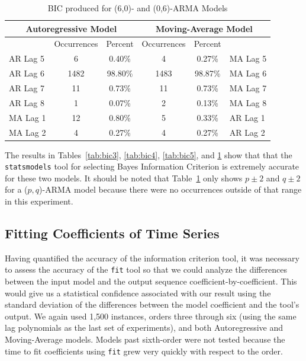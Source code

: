 \documentclass[oneside,12pt,openany]{book}
\begin{document}
    \begin{table}[hbt!]
        \centering
        \begin{tabular}{|l|c|c|c|c|l|}
            \hline
            \multicolumn{3}{|c|}{Autoregressive Model} & \multicolumn{3}{c|}{Moving-Average Model} \\ \hline
            \cellcolor{black} & Occurrences & Percent & Occurrences & Percent & \cellcolor{black} \\ \hline
            AR Lag 5 & 6 & 0.40\% & 4 & 0.27\% & MA Lag 5 \\ \hline
            AR Lag 6 & 1482 & 98.80\% & 1483 & 98.87\% & MA Lag 6 \\ \hline
            AR Lag 7 & 11 & 0.73\% & 11 & 0.73\% & MA Lag 7 \\ \hline
            AR Lag 8 & 1 & 0.07\% & 2 & 0.13\% & MA Lag 8 \\ \hline
            MA Lag 1 & 12 & 0.80\% & 5 & 0.33\% & AR Lag 1 \\ \hline
            MA Lag 2 & 4 & 0.27\% & 4 & 0.27\% & AR Lag 2 \\ \hline
        \end{tabular}
        \caption{BIC produced for (6,0)- and (0,6)-ARMA Models}
        \label{tab:bic6}
    \end{table}
    
    
    The results in Tables~\ref{tab:bic3}, \ref{tab:bic4}, \ref{tab:bic5}, and \ref{tab:bic6} show that that the \texttt{statsmodels} tool for selecting Bayes Information Criterion is extremely accurate for these two models. It should be noted that Table~\ref{tab:bic6} only shows $p\pm2$ and $q\pm2$ for a ($p,q$)-ARMA model because there were no occurrences outside of that range in this experiment.
    
    \FloatBarrier
    
    \subsection{Fitting Coefficients of Time Series}\label{sec:test:coeff}
    
    Having quantified the accuracy of the information criterion tool, it was necessary to assess the accuracy of the \texttt{fit} tool so that we could analyze the differences between the input model and the output sequence coefficient-by-coefficient. This would give us a statistical confidence associated with our result using the standard deviation of the differences between the model coefficient and the tool's output. We again used 1,500 instances, orders three through six (using the same lag polynomials as the last set of experiments), and both Autoregressive and Moving-Average models. Models past sixth-order were not tested because the time to fit coefficients using \texttt{fit} grew very quickly with respect to the order.
    
\end{document}
